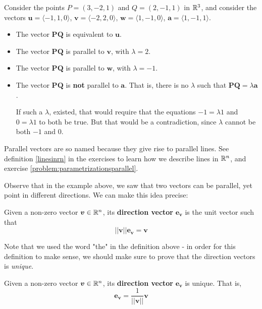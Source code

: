 \begin{example}

    Consider the points $P = (3, -2, 1)$ and $Q = (2, -1, 1)$  in $\mathbb{R}^3$, and consider the vectors $\bm{u} = \langle -1, 1, 0 \rangle$, $\bm{v} = \langle -2, 2, 0 \rangle$, $\bm{w} = \langle 1, -1, 0 \rangle$,  $\bm{a} = \langle 1, -1, 1 \rangle$.
    
    \begin{itemize}
        \item The vector $\bm{PQ}$ is equivalent to $\bm{u}$.
        \item The vector $\bm{PQ}$ is parallel to $\bm{v}$, with $\lambda = 2$.
        \item The vector $\bm{PQ}$ is parallel to $\bm{w}$, with $\lambda = -1$.
        \item The vector $\bm{PQ}$ is \textbf{not} parallel to $\bm{a}$. That is, there is no $\lambda$ such that $\bm{PQ} = \lambda \bm{a}$.
        
        If such a $\lambda$, existed, that would require that the equations $-1 = \lambda 1$ and $0 = \lambda 1$ to both be true.  But that would be a contradiction, since $\lambda$ cannot be both $-1$ and $0$.
    \end{itemize}
    
\end{example}


Parallel vectors are so named because they give rise to parallel lines.  See definition \ref{linesinrn} in the exercises to learn how we describe lines in $\mathbb{R}^n$, and exercise \ref{problem:parametrizationsparallel}.

Observe that in the example above, we saw that two vectors can be parallel, yet point in different directions.  We can make this idea precise:

    \begin{definition}
    Given a non-zero vector $\bm{v} \in \mathbb{R}^n$, its \textbf{direction vector} $\bm{e_v}$ is the unit vector such that 
    $$||\bm{v}||\bm{e_v} = \bm{v}$$
    \end{definition}

Note that we used the word "the" in the definition above - in order for this definition to make sense, we should make sure to prove that the direction vectors is \textit{unique}.

\begin{proposition}
    Given a non-zero vector $\bm{v} \in \mathbb{R}^n$, its \textbf{direction vector} $\bm{e_v}$ is unique.  That is, $$\bm{e_v} = \frac{1}{||\bm{v}||}\bm{v}$$
\end{proposition}

